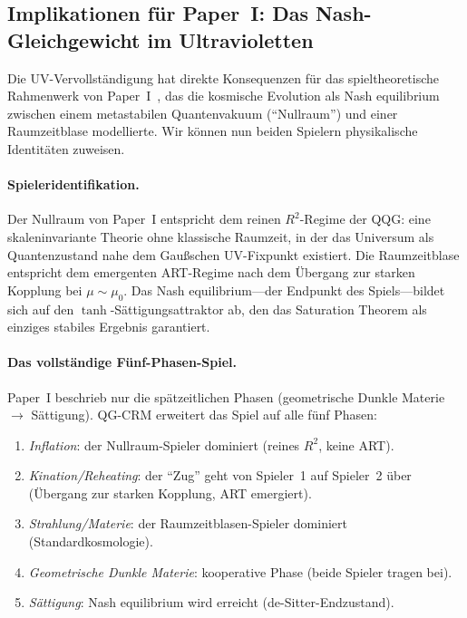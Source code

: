 \documentclass[aps,prd,twocolumn,superscriptaddress,nofootinbib]{revtex4-2}
\begin{document}
\subsection{Implikationen für Paper~I: Das Nash-Gleichgewicht im Ultravioletten}
\label{sec:paper1-implications}

Die UV-Vervollständigung hat direkte Konsequenzen für das spieltheoretische Rahmenwerk von Paper~I~\cite{Geiger2026}, das die kosmische Evolution als Nash equilibrium zwischen einem metastabilen Quantenvakuum (``Nullraum'') und einer Raumzeitblase modellierte. Wir können nun beiden Spielern physikalische Identitäten zuweisen.

\paragraph{Spieleridentifikation.}
Der Nullraum von Paper~I entspricht dem reinen $R^2$-Regime der QQG: eine skaleninvariante Theorie ohne klassische Raumzeit, in der das Universum als Quantenzustand nahe dem Gaußschen UV-Fixpunkt existiert. Die Raumzeitblase entspricht dem emergenten ART-Regime nach dem Übergang zur starken Kopplung bei $\mu \sim \mu_0$. Das Nash equilibrium---der Endpunkt des Spiels---bildet sich auf den $\tanh$-Sättigungsattraktor ab, den das Saturation Theorem als einziges stabiles Ergebnis garantiert.

\paragraph{Das vollständige Fünf-Phasen-Spiel.}
Paper~I beschrieb nur die spätzeitlichen Phasen (geometrische Dunkle Materie $\to$ Sättigung). QG-CRM erweitert das Spiel auf alle fünf Phasen:
\begin{enumerate}
\item \textit{Inflation}: der Nullraum-Spieler dominiert (reines $R^2$, keine ART).
\item \textit{Kination/Reheating}: der ``Zug'' geht von Spieler~1 auf Spieler~2 über (Übergang zur starken Kopplung, ART emergiert).
\item \textit{Strahlung/Materie}: der Raumzeitblasen-Spieler dominiert (Standardkosmologie).
\item \textit{Geometrische Dunkle Materie}: kooperative Phase (beide Spieler tragen bei).
\item \textit{Sättigung}: Nash equilibrium wird erreicht (de-Sitter-Endzustand).
\end{enumerate}
\end{document}
